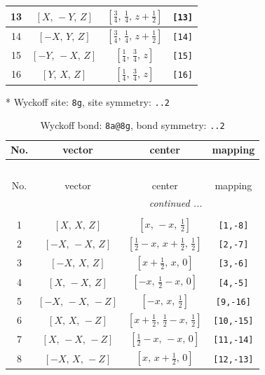 \documentclass[fleqn,8pt]{jsarticle}
\begin{document}
\begin{longtable}{cccc}
13 & $\left[ X,\, - Y,\, Z \right]$ & $\left[ \frac{3}{4},\, \frac{1}{4},\, z + \frac{1}{2} \right]$ & {\tt [13]} \\ \hline
14 & $\left[ - X,\, Y,\, Z \right]$ & $\left[ \frac{3}{4},\, \frac{1}{4},\, z + \frac{1}{2} \right]$ & {\tt [14]} \\ \hline
15 & $\left[ - Y,\, - X,\, Z \right]$ & $\left[ \frac{1}{4},\, \frac{3}{4},\, z \right]$ & {\tt [15]} \\ \hline
16 & $\left[ Y,\, X,\, Z \right]$ & $\left[ \frac{1}{4},\, \frac{3}{4},\, z \right]$ & {\tt [16]} \\
\end{longtable}
* Wyckoff site: {\tt 8g}, site symmetry: {\tt ..2}
\renewcommand{\arraystretch}{1.2}
\begin{longtable}{cccc}
\caption{Wyckoff bond: {\tt 8a@8g}, bond symmetry: {\tt ..2}}
 \\
 \hline \hline
No. & vector & center & mapping \\ \hline \endfirsthead

\multicolumn{3}{l}{\tablename\ \thetable{}} \\
 \hline \hline
No. & vector & center & mapping \\ \hline \endhead

 \hline \hline
\multicolumn{3}{r}{\footnotesize\it continued ...} \\ \endfoot

 \hline \hline
\multicolumn{3}{r}{} \\ \endlastfoot

1 & $\left[ X,\, X,\, Z \right]$ & $\left[ x,\, - x,\, \frac{1}{2} \right]$ & {\tt [1,-8]} \\ \hline
2 & $\left[ - X,\, - X,\, Z \right]$ & $\left[ \frac{1}{2} - x,\, x + \frac{1}{2},\, \frac{1}{2} \right]$ & {\tt [2,-7]} \\ \hline
3 & $\left[ - X,\, X,\, Z \right]$ & $\left[ x + \frac{1}{2},\, x,\, 0 \right]$ & {\tt [3,-6]} \\ \hline
4 & $\left[ X,\, - X,\, Z \right]$ & $\left[ - x,\, \frac{1}{2} - x,\, 0 \right]$ & {\tt [4,-5]} \\ \hline
5 & $\left[ - X,\, - X,\, - Z \right]$ & $\left[ - x,\, x,\, \frac{1}{2} \right]$ & {\tt [9,-16]} \\ \hline
6 & $\left[ X,\, X,\, - Z \right]$ & $\left[ x + \frac{1}{2},\, \frac{1}{2} - x,\, \frac{1}{2} \right]$ & {\tt [10,-15]} \\ \hline
7 & $\left[ X,\, - X,\, - Z \right]$ & $\left[ \frac{1}{2} - x,\, - x,\, 0 \right]$ & {\tt [11,-14]} \\ \hline
8 & $\left[ - X,\, X,\, - Z \right]$ & $\left[ x,\, x + \frac{1}{2},\, 0 \right]$ & {\tt [12,-13]} \\
\end{longtable}
\end{document}
